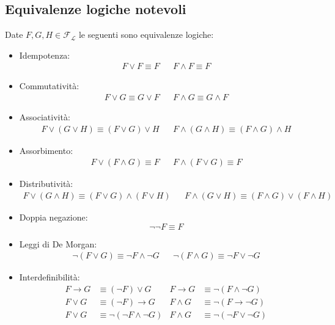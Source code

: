 \subsection{Equivalenze logiche notevoli}
Date $F, G, H \in \mathscr{F_L}$ le seguenti sono equivalenze logiche:
\begin{itemize}
  \item Idempotenza:
    \begin{align*}
      F \lor F \equiv F &&
      F \land F \equiv F
    \end{align*}
    
  \item Commutatività:
    \begin{align*}
      F \lor G \equiv G \lor F &&
      F \land G \equiv G \land F 
    \end{align*}
    
  \item Associatività:
    \begin{align*}
      F \lor (G \lor H) \equiv (F \lor G) \lor H &&
      F \land (G \land H) \equiv (F \land G) \land H
    \end{align*}
    
  \item Assorbimento:
    \label{assorbimento}
    \begin{align*}
      F \lor (F \land G) \equiv F &&
      F \land (F\lor G) \equiv F 
    \end{align*}

  \item Distributività:
    \begin{align*}
      F \lor (G \land H) \equiv (F \lor G) \land (F \lor H) &&
      F \land (G \lor H) \equiv (F \land G) \lor (F \land H)
    \end{align*}

  \item Doppia negazione:
    $$
    \neg\neg F \equiv F
    $$

  \item Leggi di De Morgan:
    \begin{align*}
      \neg (F \lor G) \equiv \neg F \land \neg G &&
      \neg (F \land G) \equiv \neg F \lor \neg G 
    \end{align*}

  \item Interdefinibilità:
    \begin{align*}
      F \rightarrow G &\equiv  (\neg F) \lor G &
      F \rightarrow G &\equiv \neg(F \land \neg G) \\
      F \lor G &\equiv (\neg F) \rightarrow G &
      F \land G &\equiv \neg(F \rightarrow \neg G) \\
      F \lor G &\equiv \neg (\neg F \land \neg G) &
      F \land G &\equiv \neg(\neg F \lor \neg G)
    \end{align*}
    

\end{itemize}
